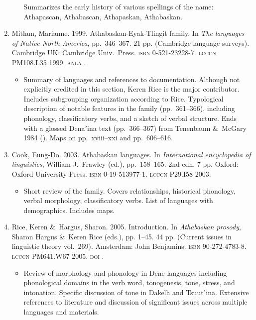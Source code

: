 \documentclass[12pt,letterpaper,oneside,article]{memoir}
\begin{document}
\begin{enumerate}
\begin{itemize}
		Summarizes the early history of various spellings of the name:
		Athapascan, Athabascan, Athapaskan, Athabaskan.
	\end{itemize}
\item	Mithun, Marianne.
	1999.
	Athabaskan-Eyak-Tlingit family.
	In \textit{The languages of Native North America}, pp.\ 346–367.
	21 pp.
	(Cambridge language surveys).
	Cambridge UK: Cambridge Univ.\ Press.
	\textsc{isbn} 0-521-23228-7.
	\textsc{lcccn} PM108.L35 1999.
	\textsc{anla} .
	\begin{itemize}
	\item	Summary of languages and references to documentation.
		Although not explicitly credited in this section, Keren Rice is the major
		contributor.
		Includes subgrouping organization according to Rice.
		Typological description of notable features in the family (pp.\ 361–366),
		including phonology, classificatory verbs, and a sketch of verbal structure.
		Ends with a glossed Denaʼina text (pp.\ 366–367)
		from Tenenbaum \&\ McGary 1984 ().
		Maps on pp.\ xviii–xxi and pp.\ 606–616.
	\end{itemize}
\item	Cook, Eung-Do.
	2003.
	Athabaskan languages.
	In \textit{International encyclopedia of linguistics},
	William J.\ Frawley (ed.),
	pp.\ 158–165.
	2nd edn.
	7 pp.
	Oxford: Oxford University Press.
	\textsc{isbn} 0-19-513977-1.
	\textsc{lcccn} P29.I58 2003.
	\begin{itemize}
	\item	Short review of the family.
		Covers relationships, historical phonology,
		verbal morphology, classificatory verbs.
		List of languages with demographics.
		Includes maps.
	\end{itemize}
\item	Rice, Keren \&\ Hargus, Sharon.
	2005.
	Introduction.
	In \textit{Athabaskan prosody},
	Sharon Hargus \&\ Keren Rice (eds.),
	pp. 1–45.
	44 pp.
	(Current issues in linguistic theory vol.\ 269).
	Amsterdam: John Benjamins.
	\textsc{isbn} 90-272-4783-8.
	\textsc{lcccn} PM641.W67 2005.
	\textsc{doi} .
	\begin{itemize}
	\item	Review of morphology and phonology in Dene languages including
		phonological domains in the verb word, tonogenesis, tone, stress, and 
		intonation.
		Specific discussion of tone in Dakelh and Tsuutʼina.
		Extensive references to literature and discussion of significant issues
		across multiple languages and materials.

\end{itemize}
\end{enumerate}
\end{document}
